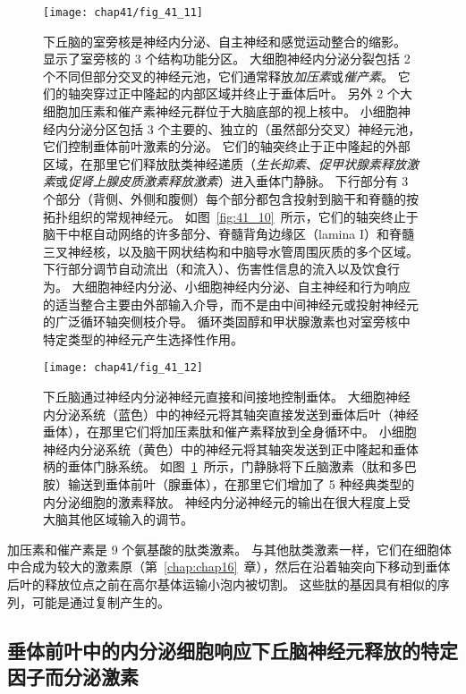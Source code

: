 \begin{figure}[htbp]
	\centering
	\texttt{[image: chap41/fig\_41\_11]}
	\caption{下丘脑的室旁核是神经内分泌、自主神经和感觉运动整合的缩影。
		显示了室旁核的 3 个结构功能分区。
		大细胞神经内分泌分裂包括 2 个不同但部分交叉的神经元池，它们通常释放\textit{加压素}或\textit{催产素}。
		它们的轴突穿过正中隆起的内部区域并终止于垂体后叶。
		另外 2 个大细胞加压素和催产素神经元群位于大脑底部的视上核中。
		小细胞神经内分泌分区包括 3 个主要的、独立的（虽然部分交叉）神经元池，它们控制垂体前叶激素的分泌。
		它们的轴突终止于正中隆起的外部区域，在那里它们释放肽类神经递质（\textit{生长抑素}、\textit{促甲状腺素释放激素}或\textit{促肾上腺皮质激素释放激素}）进入垂体门静脉。
		下行部分有 3 个部分（背侧、外侧和腹侧）每个部分都包含投射到脑干和脊髓的按拓扑组织的常规神经元。
		如图~\ref{fig:41_10}~所示，它们的轴突终止于脑干中枢自动网络的许多部分、脊髓背角边缘区（lamina I）和脊髓三叉神经核，以及脑干网状结构和中脑导水管周围灰质的多个区域。
		下行部分调节自动流出（和流入）、伤害性信息的流入以及饮食行为。
		大细胞神经内分泌、小细胞神经内分泌、自主神经和行为响应的适当整合主要由外部输入介导，而不是由中间神经元或投射神经元的广泛循环轴突侧枝介导。
		循环类固醇和甲状腺激素也对室旁核中特定类型的神经元产生选择性作用。}
	\label{fig:41_11}
\end{figure}


\begin{figure}[htbp]
	\centering
	\texttt{[image: chap41/fig\_41\_12]}
	\caption{下丘脑通过神经内分泌神经元直接和间接地控制垂体。
		大细胞神经内分泌系统（蓝色）中的神经元将其轴突直接发送到垂体后叶（神经垂体），在那里它们将加压素肽和催产素释放到全身循环中。
		小细胞神经内分泌系统（黄色）中的神经元将其轴突发送到正中隆起和垂体柄的垂体门脉系统。
		如图~\ref{fig:41_11}~所示，门静脉将下丘脑激素（肽和多巴胺）输送到垂体前叶（腺垂体），在那里它们增加了 5 种经典类型的内分泌细胞的激素释放。
		神经内分泌神经元的输出在很大程度上受大脑其他区域输入的调节。}
	\label{fig:41_12}
\end{figure}


加压素和催产素是 9 个氨基酸的肽类激素。
与其他肽类激素一样，它们在细胞体中合成为较大的激素原（第~\ref{chap:chap16}~章），然后在沿着轴突向下移动到垂体后叶的释放位点之前在高尔基体运输小泡内被切割。
这些肽的基因具有相似的序列，可能是通过复制产生的。



\subsection{垂体前叶中的内分泌细胞响应下丘脑神经元释放的特定因子而分泌激素}

